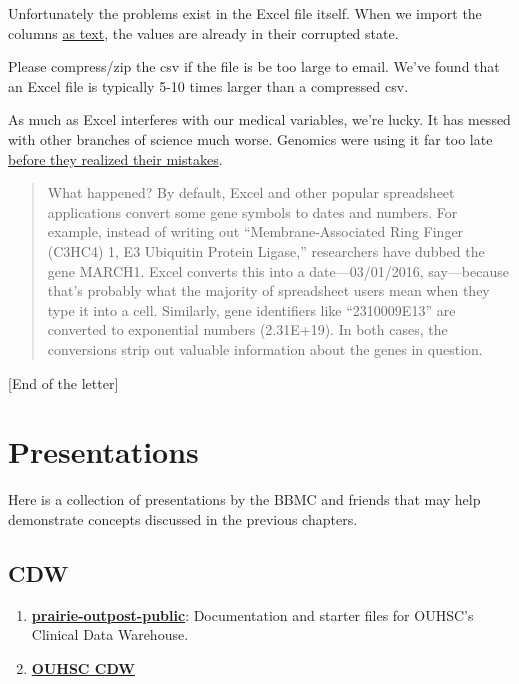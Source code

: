 \documentclass[
]{book}
\providecommand{\tightlist}{%
  \setlength{\itemsep}{0pt}\setlength{\parskip}{0pt}}
\begin{document}
Unfortunately the problems exist in the Excel file itself. When we import the columns \href{https://readxl.tidyverse.org/reference/read_excel.html}{as text}, the values are already in their corrupted state.

Please compress/zip the csv if the file is be too large to email. We've found that an Excel file is typically 5-10 times larger than a compressed csv.

As much as Excel interferes with our medical variables, we're lucky. It has messed with other branches of science much worse. Genomics were using it far too late \href{https://qz.com/768334/years-of-genomics-research-is-riddled-with-errors-thanks-to-a-bunch-of-botched-excel-spreadsheets/}{before they realized their mistakes}.

\begin{quote}
What happened? By default, Excel and other popular spreadsheet applications convert some gene symbols to dates and numbers. For example, instead of writing out ``Membrane-Associated Ring Finger (C3HC4) 1, E3 Ubiquitin Protein Ligase,'' researchers have dubbed the gene MARCH1. Excel converts this into a date---03/01/2016, say---because that's probably what the majority of spreadsheet users mean when they type it into a cell. Similarly, gene identifiers like ``2310009E13'' are converted to exponential numbers (2.31E+19). In both cases, the conversions strip out valuable information about the genes in question.
\end{quote}

{[}End of the letter{]}

\hypertarget{presentations}{%
\chapter{Presentations}\label{presentations}}

Here is a collection of presentations by the BBMC and friends that may help demonstrate concepts discussed in the previous chapters.

\hypertarget{cdw}{%
\section{CDW}\label{cdw}}

\begin{enumerate}
\def\labelenumi{\arabic{enumi}.}
\tightlist
\item
  \textbf{\href{https://github.com/OuhscBbmc/prairie-outpost-public}{prairie-outpost-public}}: Documentation and starter files for OUHSC's Clinical Data Warehouse.
\item
  \textbf{\href{https://github.com/OuhscBbmc/BbmcResources/blob/master/Publications/presentation-2015-11-18-cdw-bse/clinical-data-warehouse-bse.pdf}{OUHSC CDW}}
\end{enumerate}
\end{document}
